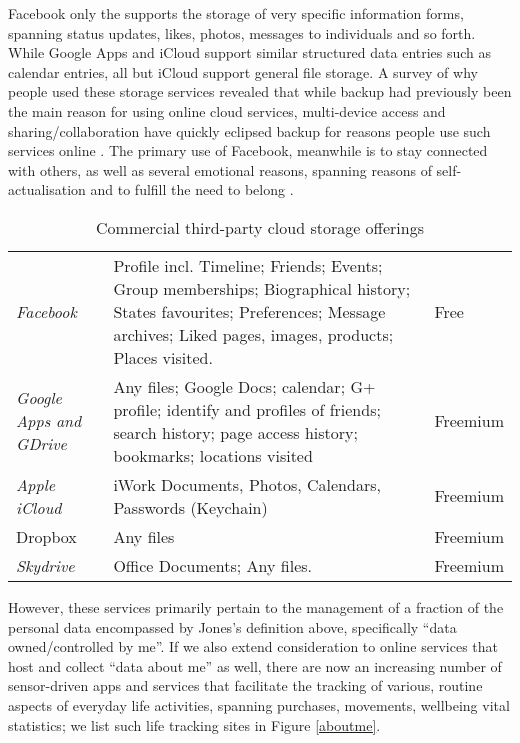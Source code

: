 \documentclass[graybox]{svmult}
\begin{document}
Facebook only the supports the storage of very specific information forms, spanning status updates, likes, photos, messages to individuals and so forth.  While Google Apps and iCloud support similar structured data entries such as calendar entries, all but iCloud support general file storage.  A survey of why people used these storage services revealed that while backup had previously been the main reason for using online cloud services, multi-device access and sharing/collaboration have quickly eclipsed backup for reasons people use such services online \cite{van2009note}. The primary use of Facebook, meanwhile is to stay connected with others, as well as several emotional reasons, spanning reasons of self-actualisation and to fulfill the need to belong \cite{nadkarni2012people}.

\begin{table}
\begin{tabular}{p{2.2cm} p{8cm} l}

\emph{Facebook} & Profile incl. Timeline; Friends; Events; Group memberships; Biographical history; States favourites; Preferences; Message archives; Liked pages, images, products; Places visited. & Free \\

\emph{Google Apps and GDrive} & Any files; Google Docs; calendar; G+ profile; identify and profiles of friends; search history; page access history; bookmarks; locations visited & Freemium\\

\emph{Apple iCloud} & iWork Documents, Photos, Calendars, Passwords (Keychain) & Freemium \\
Dropbox & Any files & Freemium \\

\emph{Skydrive} & Office Documents; Any files. & Freemium \\

\end{tabular}
\caption{Commercial third-party cloud storage offerings}
\label{fig:cloudstorage}
\end{table}

However, these services primarily pertain to the management of a fraction of the personal data encompassed by Jones's definition above, specifically ``data owned/controlled by me''.  If we also extend consideration to online services that host and collect ``data about me'' as well, there are now an increasing number of sensor-driven apps and services that facilitate the tracking of various, routine aspects of everyday life activities, spanning purchases, movements, wellbeing vital statistics; we list such life tracking sites in Figure \ref{aboutme}.
\end{document}
